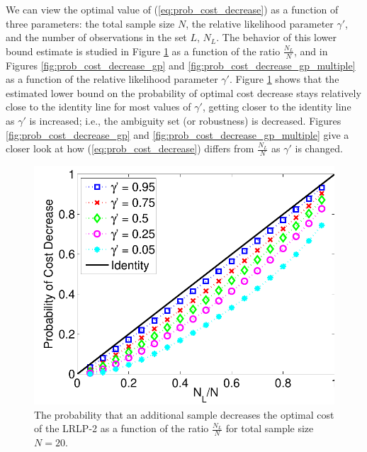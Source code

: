 \documentclass{iserc}
\begin{document}
We can view the optimal value of (\ref{eq:prob_cost_decrease}) as a function of three parameters: the total sample size $N$, the relative likelihood parameter $\gamma'$, and the number of observations in the set $L$, $N_L$.
The behavior of this lower bound estimate is studied in Figure \ref{fig:prob_cost_decrease_nd_n} as a function of the ratio $\tfrac{N_L}{N}$, and in Figures \ref{fig:prob_cost_decrease_gp} and \ref{fig:prob_cost_decrease_gp_multiple} as a function of the relative likelihood parameter $\gamma'$.
Figure \ref{fig:prob_cost_decrease_nd_n} shows that the estimated lower bound on the probability of optimal cost decrease stays relatively close to the identity line for most values of $\gamma'$, getting closer to the identity line as  $\gamma'$ is increased; i.e., the ambiguity set (or robustness) is decreased.
Figures \ref{fig:prob_cost_decrease_gp} and \ref{fig:prob_cost_decrease_gp_multiple} give a closer look at how (\ref{eq:prob_cost_decrease}) differs from $\tfrac{N_L}{N}$ as $\gamma'$ is changed.

\begin{figure}
	\centering
	\includegraphics[width=.5\textwidth]{images/prob_dec_cost_v_nl_n_20}
	\caption{The probability that an additional sample decreases the optimal cost of the LRLP-2 as a function of the ratio $\frac{N_L}{N}$ for total sample size $N = 20$.}
	\label{fig:prob_cost_decrease_nd_n}
\end{figure}
\end{document}
